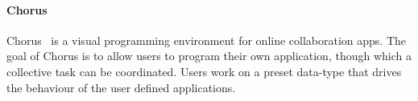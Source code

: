 \paragraph{Chorus} %

Chorus~\cite{chen2017chorus} is a visual programming environment for online
collaboration apps. The goal of Chorus is to allow users to program their own
application, though which a collective task can be coordinated. Users work on a
preset data-type that drives the behaviour of the user defined applications.
